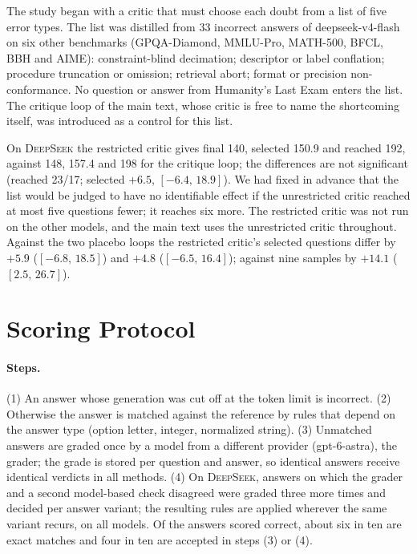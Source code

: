 \documentclass[11pt]{article}
\newcommand{\ds}{\textsc{DeepSeek}}
\newcommand{\ci}[2]{$[#1,\,#2]$}
\begin{document}
The study began with a critic that must choose each doubt from a list of five error types.
The list was distilled from 33 incorrect answers of deepseek-v4-flash on six other benchmarks (GPQA-Diamond, MMLU-Pro, MATH-500, BFCL, BBH and AIME): constraint-blind decimation; descriptor or label conflation; procedure truncation or omission; retrieval abort; format or precision non-conformance.
No question or answer from Humanity's Last Exam enters the list.
The critique loop of the main text, whose critic is free to name the shortcoming itself, was introduced as a control for this list.

On \ds{} the restricted critic gives final 140, selected 150.9 and reached 192, against 148, 157.4 and 198 for the critique loop; the differences are not significant (reached 23/17; selected $+6.5$, \ci{-6.4}{18.9}).
We had fixed in advance that the list would be judged to have no identifiable effect if the unrestricted critic reached at most five questions fewer; it reaches six more.
The restricted critic was not run on the other models, and the main text uses the unrestricted critic throughout.
Against the two placebo loops the restricted critic's selected questions differ by $+5.9$ (\ci{-6.8}{18.5}) and $+4.8$ (\ci{-6.5}{16.4}); against nine samples by $+14.1$ (\ci{2.5}{26.7}).

\section{Scoring Protocol}
\label{app:scoring}

\paragraph{Steps.}
(1) An answer whose generation was cut off at the token limit is incorrect.
(2) Otherwise the answer is matched against the reference by rules that depend on the answer type (option letter, integer, normalized string).
(3) Unmatched answers are graded once by a model from a different provider (gpt-6-astra), the grader; the grade is stored per question and answer, so identical answers receive identical verdicts in all methods.
(4) On \ds, answers on which the grader and a second model-based check disagreed were graded three more times and decided per answer variant; the resulting rules are applied wherever the same variant recurs, on all models.
Of the answers scored correct, about six in ten are exact matches and four in ten are accepted in steps (3) or (4).
\end{document}
